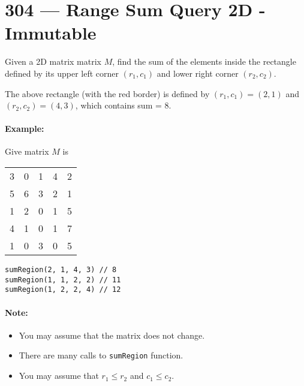 \section{304 --- Range Sum Query 2D - Immutable}
Given a 2D matrix matrix $M$, find the sum of the elements inside the rectangle defined by its upper left corner $(r_1, c_1)$ and lower right corner $(r_2, c_2)$.
\begin{figure}[H]
\end{figure}
The above rectangle (with the red border) is defined by $(r_1, c_1) = (2, 1)$ and $(r_2, c_2) = (4, 3)$, which contains sum = 8.
\paragraph{Example:}
\begin{flushleft}
Give matrix $M$ is
\begin{table}[H]
    \begin{tabular}{ccccc}
        3 & 0 & 1 & 4 & 2 \\
        5 &  6 &  3 &  2 &  1\\
        1 &  2 &  0 &  1 &  5 \\
        4 &  1 &  0 &  1 &  7\\
        1 &  0 &  3 &  0 &  5
    \end{tabular}
\end{table}
\begin{lstlisting}[style=customc]
sumRegion(2, 1, 4, 3) // 8
sumRegion(1, 1, 2, 2) // 11
sumRegion(1, 2, 2, 4) // 12
\end{lstlisting}
\end{flushleft}
\paragraph{Note:}
\begin{itemize}
    \item You may assume that the matrix does not change.
    \item There are many calls to \texttt{sumRegion} function.
    \item You may assume that $r_1 \leq r_2$ and $c_1 \leq c_2$.
\end{itemize}
